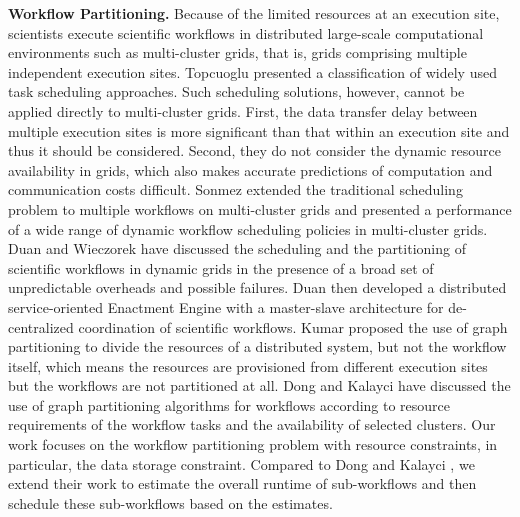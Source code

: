 \textbf{Workflow Partitioning.} Because of the limited resources at an execution site, scientists execute scientific workflows \cite{Bharathi2008, Rubing2005} in distributed large-scale computational environments such as multi-cluster grids, that is, grids comprising multiple independent execution sites. Topcuoglu \cite{Topcuoglu2002} presented a classification of widely used task scheduling approaches. Such scheduling solutions, however, cannot be applied directly to multi-cluster grids. First, the data transfer delay between multiple execution sites is more significant than that within an execution site and thus it should be considered. Second, they do not consider the dynamic resource availability in grids, which also makes accurate predictions of computation and communication costs difficult. Sonmez \cite{Sonmez2010} extended the traditional scheduling problem to multiple workflows on multi-cluster grids and presented a performance of a wide range of dynamic workflow scheduling policies in multi-cluster grids. Duan \cite{Rubing2005} and Wieczorek \cite{Wieczorek2005} have discussed the scheduling and the partitioning of scientific workflows in dynamic grids in the presence of a broad set of unpredictable overheads and possible failures. Duan \cite{Rubing2005} then developed a distributed service-oriented Enactment Engine with a master-slave architecture for de-centralized coordination of scientific workflows. Kumar \cite{Kumar2002} proposed the use of graph partitioning to divide the resources of a distributed system, but not the workflow itself, which means the resources are provisioned from different execution sites but the workflows are not partitioned at all. Dong \cite{Dong2007} and Kalayci \cite{Kalayci2010} have discussed the use of graph partitioning algorithms for workflows according to resource requirements of the workflow tasks and the availability of selected clusters. Our work focuses on the workflow partitioning problem with resource constraints, in particular, the data storage constraint. Compared to Dong \cite{Dong2007} and Kalayci \cite{Kalayci2010}, we extend their work to estimate the overall runtime of sub-workflows and then schedule these sub-workflows based on the estimates. 



